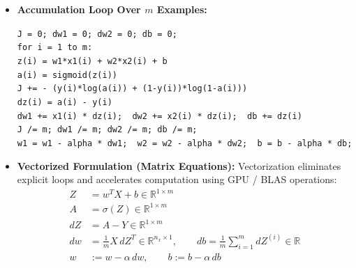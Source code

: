 \documentclass[10pt,a4paper]{article}
\begin{document}
\begin{itemize}[leftmargin=12pt, itemsep=2pt]
    \item \textbf{Accumulation Loop Over $m$ Examples:}
    \begin{tcolorbox}[colframe=themeblue, colback=codebg, arc=1.2mm, boxrule=0.4pt, left=6pt, right=6pt, top=2.5pt, bottom=2.5pt]
    \small
    \texttt{J = 0; dw1 = 0; dw2 = 0; db = 0;}\\
    \texttt{for i = 1 to m:}\\
    \hspace*{12pt}\texttt{z(i) = w1*x1(i) + w2*x2(i) + b}\\
    \hspace*{12pt}\texttt{a(i) = sigmoid(z(i))}\\
    \hspace*{12pt}\texttt{J += - (y(i)*log(a(i)) + (1-y(i))*log(1-a(i)))}\\
    \hspace*{12pt}\texttt{dz(i) = a(i) - y(i)}\\
    \hspace*{12pt}\texttt{dw1 += x1(i) * dz(i); \ dw2 += x2(i) * dz(i); \ db += dz(i)}\\
    \texttt{J /= m; dw1 /= m; dw2 /= m; db /= m;}\\
    \texttt{w1 = w1 - alpha * dw1; \ w2 = w2 - alpha * dw2; \ b = b - alpha * db;}
    \end{tcolorbox}

    \item \textbf{Vectorized Formulation (Matrix Equations):}
    Vectorization eliminates explicit loops and accelerates computation using GPU / BLAS operations:
    \begin{align*}
        Z &= w^T X + b \in \mathbb{R}^{1 \times m} \\[2pt]
        A &= \sigma(Z) \in \mathbb{R}^{1 \times m} \\[2pt]
        dZ &= A - Y \in \mathbb{R}^{1 \times m} \\[2pt]
        dw &= \frac{1}{m} X \, dZ^T \in \mathbb{R}^{n_x \times 1}, \qquad db = \frac{1}{m} \sum_{i=1}^m dZ^{(i)} \in \mathbb{R} \\[2pt]
        w &:= w - \alpha \, dw, \qquad b := b - \alpha \, db
    \end{align*}
\end{itemize}

\newpage
\end{document}
